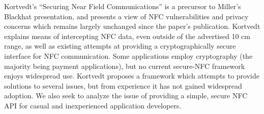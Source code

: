 \documentclass[12pt]{article}
\begin{document}
Kortvedt's ``Securing Near Field Communications''\cite{kortvedt2009} is a precursor to Miller's Blackhat presentation, and presents a view of NFC vulnerabilities and privacy concerns which remains largely unchanged since the paper's publication.
Kortvedt explains means of intercepting NFC data, even outside of the advertised 10 cm range, as well as existing attempts at providing a cryptographically secure interface for NFC communication.
Some applications employ cryptography (the majority being payment applications), but no current secure-NFC framework enjoys widespread use.
Kortvedt proposes a framework which attempts to provide solutions to several issues, but from experience it has not gained widespread adoption.
We also seek to analyze the issue of providing a simple, secure NFC API for casual and inexperienced application developers.
%
%
\end{document}
